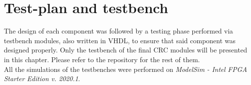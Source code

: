 %
\chapter{Test-plan and testbench}\label{ch:testplan}
The design of each component was followed by a testing phase performed via testbench modules, also written in VHDL, to ensure that said component was designed properly. Only the testbench of the final CRC modules will be presented in this chapter. Please refer to the repository for the rest of them.\\
\hfill \break
All the simulations of the testbenches were performed on \textit{ModelSim - Intel FPGA Starter Edition v. 2020.1}.\\

